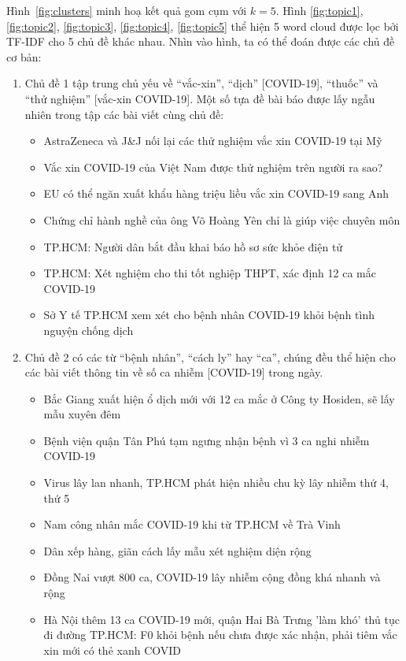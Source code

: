 Hình~\ref{fig:clusters} minh hoạ kết quả gom cụm với $k=5$. Hình
\ref{fig:topic1}, \ref{fig:topic2}, \ref{fig:topic3}, \ref{fig:topic4},
\ref{fig:topic5} thể hiện 5 word cloud được lọc bởi TF-IDF cho 5 chủ đề khác
nhau. Nhìn vào hình, ta có thể đoán được các chủ đề cơ bản:
\begin{enumerate}

    \item Chủ đề 1 tập trung chủ yếu về ``vắc-xin'', ``dịch'' [COVID-19], ``thuốc''
        và ``thử nghiệm'' [vắc-xin COVID-19]. Một số tựa đề bài báo được lấy ngẫu
        nhiên trong tập các bài viết cùng chủ đề:
        \begin{itemize}
            \item AstraZeneca và J\&J nối lại các thử nghiệm vắc xin COVID-19 tại Mỹ
            \item Vắc xin COVID-19 của Việt Nam được thử nghiệm trên người ra sao?
            \item EU có thể ngăn xuất khẩu hàng triệu liều vắc xin COVID-19 sang Anh
            \item Chứng chỉ hành nghề của ông Võ Hoàng Yên chỉ là giúp việc chuyên môn
            \item TP.HCM: Người dân bắt đầu khai báo hồ sơ sức khỏe điện tử
            \item TP.HCM: Xét nghiệm cho thi tốt nghiệp THPT, xác định 12 ca mắc COVID-19
            \item Sở Y tế TP.HCM xem xét cho bệnh nhân COVID-19 khỏi bệnh tình nguyện chống dịch
        \end{itemize}


    \item Chủ đề 2 có các từ ``bệnh nhân'', ``cách ly'' hay ``ca'', chúng đều thể
        hiện cho các bài viết thông tin về số ca nhiễm [COVID-19] trong ngày.
        \begin{itemize}
            \item Bắc Giang xuất hiện ổ dịch mới với 12 ca mắc ở Công ty Hosiden, sẽ lấy mẫu xuyên đêm
            \item Bệnh viện quận Tân Phú tạm ngưng nhận bệnh vì 3 ca nghi nhiễm COVID-19
            \item Virus lây lan nhanh, TP.HCM phát hiện nhiều chu kỳ lây nhiễm thứ 4, thứ 5
            \item Nam công nhân mắc COVID-19 khi từ TP.HCM về Trà Vinh
            \item Dân xếp hàng, giãn cách lấy mẫu xét nghiệm diện rộng
            \item Đồng Nai vượt 800 ca, COVID-19 lây nhiễm cộng đồng khá nhanh và rộng
            \item Hà Nội thêm 13 ca COVID-19 mới, quận Hai Bà Trưng 'làm khó' thủ tục đi đường
            TP.HCM: F0 khỏi bệnh nếu chưa được xác nhận, phải tiêm vắc xin mới có thẻ xanh COVID
        \end{itemize}


\end{enumerate}
